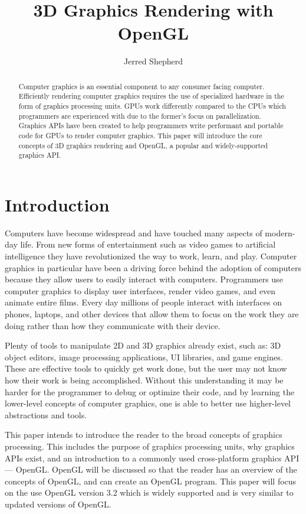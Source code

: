 \documentclass{article}
\title{\Large\textbf{3D Graphics Rendering with OpenGL}}
\author{Jerred Shepherd}
\begin{document}
\begin{titlingpage}
    \maketitle
    \begin{abstract}
    Computer graphics is an essential component to any consumer facing computer. Efficiently rendering computer graphics requires the use of specialized hardware in the form of graphics processing units. GPUs work differently compared to the CPUs which programmers are experienced with due to the former's focus on parallelization. Graphics APIs have been created to help programmers write performant and portable code for GPUs to render computer graphics. This paper will introduce the core concepts of 3D graphics rendering and OpenGL, a popular and widely-supported graphics API.
    \end{abstract}
\end{titlingpage}

\section{Introduction}
Computers have become widespread and have touched many aspects of modern-day life. From new forms of entertainment such as video games to artificial intelligence they have revolutionized the way to work, learn, and play. Computer graphics in particular have been a driving force behind the adoption of computers because they allow users to easily interact with computers. Programmers use computer graphics to display user interfaces, render video games, and even animate entire films. Every day millions of people interact with interfaces on phones, laptops, and other devices that allow them to focus on the work they are doing rather than how they communicate with their device. %

Plenty of tools to manipulate 2D and 3D graphics already exist, such as: 3D object editors, image processing applications, UI libraries, and game engines. These are effective tools to quickly get work done, but the user may not know how their work is being accomplished. Without this understanding it may be harder for the programmer to debug or optimize their code, and by learning the lower-level concepts of computer graphics, one is able to better use higher-level abstractions and tools. %

This paper intends to introduce the reader to the broad concepts of graphics processing. This includes the purpose of graphics processing units, why graphics APIs exist, and an introduction to a commonly used cross-platform graphics API --- OpenGL. OpenGL will be discussed so that the reader has an overview of the concepts of OpenGL, and can create an OpenGL program. This paper will focus on the use OpenGL version 3.2 which is widely supported and is very similar to updated versions of OpenGL.
\end{document}
